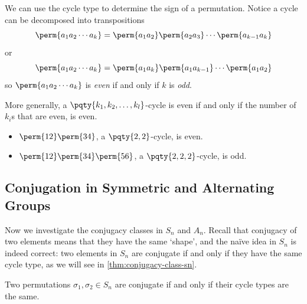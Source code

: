\begin{remark}
    We can use the cycle type to determine the sign of a permutation. Notice a cycle can be decomposed into transpositions
    \[
        \perm{{a_1} {a_2} \cdots {a_k}} = \perm{{a_1} {a_2}} \perm{{a_2} {a_3}} \cdots \perm{{a_{k - 1}}{a_k}}
    \]
    or
    \[
        \perm{{a_1} {a_2} \cdots {a_k}} = \perm{{a_1} {a_k}} \perm{{a_1} {a_{k - 1}}} \cdots \perm{{a_1} {a_2}}
    \]
    so \(\perm{{a_1} {a_2} \cdots {a_k}}\) is \emph{even} if and only if \(k\) is \emph{odd}.

    More generally, a \(\pqty{k_1, k_2, \ldots, k_l}\)-cycle is even if and only if the number of \(k_i\)s that are even, is even.
\end{remark}

\begin{example*}
    \begin{itemize}
        \item \(\perm{12}\perm{34}\), a \(\pqty{2, 2}\)-cycle, is even.

        \item \(\perm{12}\perm{34}\perm{56}\), a \(\pqty{2, 2, 2}\)-cycle, is odd.
    \end{itemize}
\end{example*}

\subsection{Conjugation in Symmetric and Alternating Groups}
\label{sec:conjugation-in-sn-an}

Now we investigate the conjugacy classes in \(S_n\) and \(A_n\). Recall that conjugacy of two elements means that they have the same `shape', and the na\"{i}ve idea in \(S_n\) is indeed correct: two elements in \(S_n\) are conjugate if and only if they have the same cycle type, as we will see in \autoref{thm:conjugacy-class-sn}.

\begin{theorem}
    \label{thm:conjugacy-class-sn}
    Two permutations \(\sigma_1, \sigma_2 \in S_n\) are conjugate if and only if their cycle types are the same.
\end{theorem}

